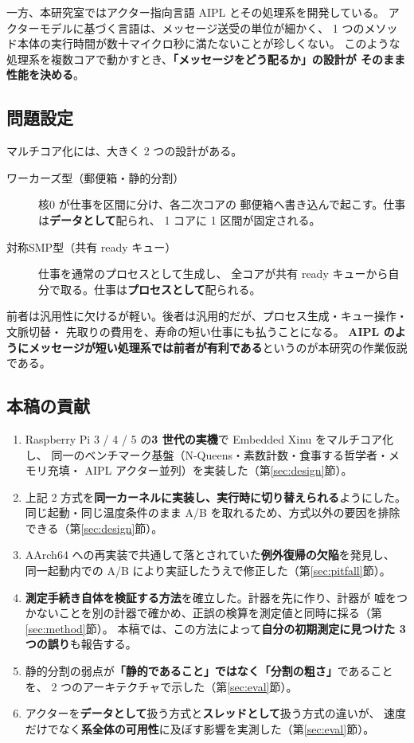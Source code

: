 \documentclass[a4paper,11pt]{ltjsarticle}
\begin{document}
一方、本研究室ではアクター指向言語 AIPL とその処理系を開発している。
アクターモデル\cite{agha}に基づく言語は、メッセージ送受の単位が細かく、
1 つのメソッド本体の実行時間が数十マイクロ秒に満たないことが珍しくない。
このような処理系を複数コアで動かすとき、\textbf{「メッセージをどう配るか」の設計が
そのまま性能を決める}。

\subsection{問題設定}
マルチコア化には、大きく 2 つの設計がある。

\begin{description}
\item[ワーカーズ型（郵便箱・静的分割）] 核0 が仕事を区間に分け、各二次コアの
  郵便箱へ書き込んで起こす。仕事は\textbf{データとして}配られ、
  1 コアに 1 区間が固定される。
\item[対称SMP型（共有 ready キュー）] 仕事を通常のプロセスとして生成し、
  全コアが共有 ready キューから自分で取る。仕事は\textbf{プロセスとして}配られる。
\end{description}

前者は汎用性に欠けるが軽い。後者は汎用的だが、プロセス生成・キュー操作・文脈切替・
先取りの費用を、寿命の短い仕事にも払うことになる。
\textbf{AIPL のようにメッセージが短い処理系では前者が有利である}というのが本研究の作業仮説である。

\subsection{本稿の貢献}
\begin{enumerate}
\item Raspberry Pi 3 / 4 / 5 の\textbf{3 世代の実機}で Embedded Xinu をマルチコア化し、
      同一のベンチマーク基盤（N-Queens・素数計数・食事する哲学者・メモリ充填・
      AIPL アクター並列）を実装した（第\ref{sec:design}節）。
\item 上記 2 方式を\textbf{同一カーネルに実装し、実行時に切り替えられる}ようにした。
      同じ起動・同じ温度条件のまま A/B を取れるため、方式以外の要因を排除できる（第\ref{sec:design}節）。
\item AArch64 への再実装で共通して落とされていた\textbf{例外復帰の欠陥}を発見し、
      同一起動内での A/B により実証したうえで修正した（第\ref{sec:pitfall}節）。
\item \textbf{測定手続き自体を検証する方法}を確立した。計器を先に作り、計器が
      嘘をつかないことを別の計器で確かめ、正誤の検算を測定値と同時に採る（第\ref{sec:method}節）。
      本稿では、この方法によって\textbf{自分の初期測定に見つけた 3 つの誤り}も報告する。
\item 静的分割の弱点が\textbf{「静的であること」ではなく「分割の粗さ」}であることを、
      2 つのアーキテクチャで示した（第\ref{sec:eval}節）。
\item アクターを\textbf{データとして}扱う方式と\textbf{スレッドとして}扱う方式の違いが、
      速度だけでなく\textbf{系全体の可用性}に及ぼす影響を実測した（第\ref{sec:eval}節）。
\end{enumerate}
\end{document}
